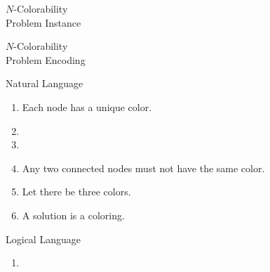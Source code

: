 \begin{frame}{$N$-Colorability\\
  \normalsize Problem \alert{Instance} }
\end{frame}
\begin{frame}{$N$-Colorability\\
              \normalsize {} Problem \alert{Encoding}}
\begin{minipage}[t]{0.47\linewidth}
\begin{block}{Natural Language}
  \begin{enumerate}
  \item \alert<1-2,7-8>{Each node has
        a} \alert<1,3,7-8>{unique} \alert<1-2,7-8>{color}.
  \item[]
  \item[]
\vspace{4mm}
  \item<4-> \alert<4>{Any two connected nodes must not have
                  the same color.}
  \item<5-> \alert<5>{Let there be three colors.}
\vspace{3mm}
  \item<6-> \alert<6>{A solution is a coloring.}
  \end{enumerate}
\end{block}
\end{minipage}
\begin{minipage}[t]{0.47\linewidth}
\begin{block}{Logical Language}
  \begin{enumerate}
  \item<2->\small
{}
{%
}
\end{enumerate}
\end{block}
\end{minipage}
\end{frame}
